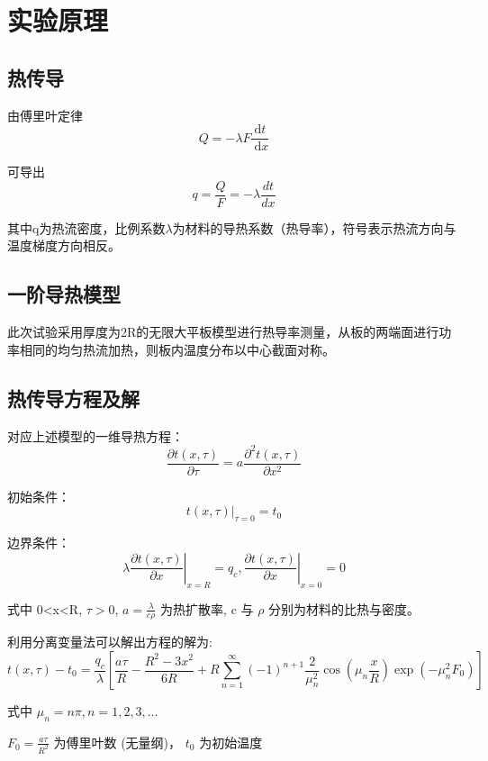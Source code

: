 \documentclass[UTF8]{ctexart}
\begin{document}
\section{实验原理}
    \subsection {热传导} 
    由傅里叶定律
    $$
    Q=-\lambda F \frac{\mathrm{d} t}{\mathrm{~d} x}
    $$
    
    可导出
    $$
    q=\frac{Q}{F}=-\lambda \frac{d t}{d x}
    $$

    其中q为热流密度，比例系数$\lambda$为材料的导热系数（热导率），符号表示热流方向与温度梯度方向相反。

    \subsection {一阶导热模型} 

    此次试验采用厚度为2R的无限大平板模型进行热导率测量，从板的两端面进行功率相同的均匀热流加热，则板内温度分布以中心截面对称。





    \subsection {热传导方程及解} 

    对应上述模型的一维导热方程：
    $$
    \frac{\partial t(x, \tau)}{\partial \tau}=a \frac{\partial^{2} t(x, \tau)}{\partial x^{2}}
    $$

    初始条件：
$$
\left.t(x, \tau)\right|_{\tau=0}=t_{0}
$$

    边界条件：
$$
\left.\lambda \frac{\partial t(x, \tau)}{\partial x}\right|_{x=R}=q_{c},\left.\frac{\partial t(x, \tau)}{\partial x}\right|_{x=0}=0
$$

    式中  0<x<R, $\tau>0$, $a=\frac{\lambda}{c \rho}$  为热扩散率,  c  与 $ \rho $ 分别为材料的比热与密度。

    利用分离变量法可以解出方程的解为:
    $$
    t(x, \tau)-t_{0}=\frac{q_{c}}{\lambda}\left[\frac{a \tau}{R}-\frac{R^{2}-3 x^{2}}{6 R}+R \sum_{n=1}^{\infty}(-1)^{n+1} \frac{2}{\mu_{n}^{2}} \cos \left(\mu_{n} \frac{x}{R}\right) \exp \left(-\mu_{n}^{2} F_{0}\right)\right]
    $$

    式中 $ \mu_{n}=n \pi, n=1,2,3, \ldots $

    $F_{0}=\frac{a \tau}{R^{2}}$  为傅里叶数 (无量纲)，
    $ t_{0} $ 为初始温度
\end{document}
